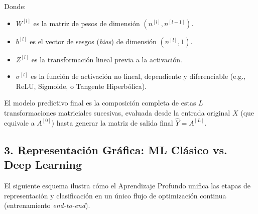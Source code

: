Donde:
\begin{itemize}
    \item $W^{[l]}$ es la matriz de pesos de dimensión $(n^{[l]}, n^{[l-1]})$.
    \item $b^{[l]}$ es el vector de sesgos (\textit{bias}) de dimensión $(n^{[l]}, 1)$.
    \item $Z^{[l]}$ es la transformación lineal previa a la activación.
    \item $\sigma^{[l]}$ es la función de activación no lineal, dependiente y diferenciable (e.g., ReLU, Sigmoide, o Tangente Hiperbólica).
\end{itemize}

El modelo predictivo final es la composición completa de estas $L$ transformaciones matriciales sucesivas, evaluada desde la entrada original $X$ (que equivale a $A^{[0]}$) hasta generar la matriz de salida final $\hat{Y} = A^{[L]}$.

\subsection{3. Representación Gráfica: ML Clásico vs. Deep Learning}
El siguiente esquema ilustra cómo el Aprendizaje Profundo unifica las etapas de representación y clasificación en un único flujo de optimización continua (entrenamiento \textit{end-to-end}).

